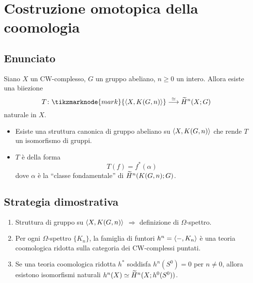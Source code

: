 \documentclass[9pt]{beamer}
\begin{document}
\newcommand*{\statemainresult}{%
\begin{theorem}
Siano $X$ un CW-complesso, $G$ un gruppo abeliano, $n\ge 0$ un intero. Allora esiste una biiezione
\[
\map[\iso]{T}{\tikzmarknode{mark}{\hmaps{X,K(G,n)}}}{\til{H}^n(X;G)}
\]
naturale in $X$.
\end{theorem}
}
\section*{Costruzione omotopica della coomologia}
\subsection*{Enunciato}
\begin{frame*}
\statemainresult%
\pause\pause
\begin{itemize}[<+->]
\item Esiste una struttura canonica di gruppo abeliano su $\langle X,K(G,n)\rangle$ che rende $T$ un isomorfismo di gruppi.
\item $T$ è della forma
\[
T(f)=f^*(\alpha)
\]
dove $\alpha$ è la ``classe fondamentale'' di $\widetilde{H}^n(K(G,n);G)$.
\end{itemize}
\end{frame*}

\subsection*{Strategia dimostrativa}
\begin{frame*}
\begin{enumerate}[<+->]
\addtolength\itemsep{1em}
\item Struttura di gruppo su $\langle X,K(G,n)\rangle$ $\Longrightarrow$ definizione di $\Omega$-spettro.
\item Per ogni $\Omega$-spettro $\{K_n\}$, la famiglia di funtori $h^n=\langle -,K_n\rangle$ è una teoria coomologica ridotta sulla categoria dei CW-complessi puntati.
\item Se una teoria coomologica ridotta $h^*$ soddisfa $h^n(S^0)=0$ per $n\neq 0$, allora esistono isomorfismi naturali $h^n(X)\simeq\widetilde{H}^n(X;h^0(S^0))$.
\end{enumerate}
\end{frame*}




\end{document}
